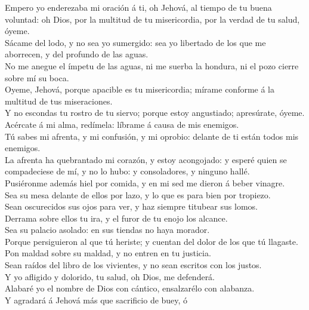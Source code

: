  Empero yo enderezaba mi oración á ti, oh Jehová, al
tiempo de tu buena voluntad: oh Dios, por la multitud de tu
misericordia, por la verdad de tu salud, óyeme.\\
 Sácame del lodo, y no sea yo sumergido: sea yo libertado
de los que me aborrecen, y del profundo de las aguas.\\
 No me anegue el ímpetu de las aguas, ni me suerba la
hondura, ni el pozo cierre sobre mí su boca.\\
 Oyeme, Jehová, porque apacible es tu misericordia;
mírame conforme á la multitud de tus miseraciones.\\
 Y no escondas tu rostro de tu siervo; porque estoy
angustiado; apresúrate, óyeme.\\
 Acércate á mi alma, redímela: líbrame á causa de mis
enemigos.\\
 Tú sabes mi afrenta, y mi confusión, y mi oprobio:
delante de ti están todos mis enemigos.\\
 La afrenta ha quebrantado mi corazón, y estoy
acongojado: y esperé quien se compadeciese de mí, y no lo hubo: y
consoladores, y ninguno hallé.\\
 Pusiéronme además hiel por comida, y en mi sed me dieron
á beber vinagre.\\
 Sea su mesa delante de ellos por lazo, y lo que es para
bien por tropiezo.\\
 Sean oscurecidos sus ojos para ver, y haz siempre
titubear sus lomos.\\
 Derrama sobre ellos tu ira, y el furor de tu enojo los
alcance.\\
 Sea su palacio asolado: en sus tiendas no haya
morador.\\
 Porque persiguieron al que tú heriste; y cuentan del
dolor de los que tú llagaste.\\
 Pon maldad sobre su maldad, y no entren en tu
justicia.\\
 Sean raídos del libro de los vivientes, y no sean
escritos con los justos.\\
 Y yo afligido y dolorido, tu salud, oh Dios, me
defenderá.\\
 Alabaré yo el nombre de Dios con cántico, ensalzarélo
con alabanza.\\
 Y agradará á Jehová más que sacrificio de buey, ó
